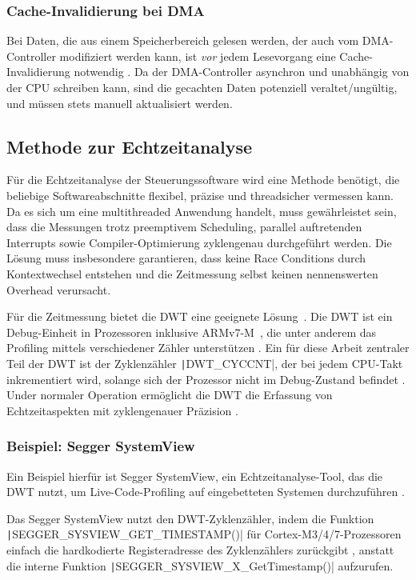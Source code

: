 \subsubsection{Cache-Invalidierung bei DMA}

Bei Daten, die aus einem Speicherbereich gelesen werden, der auch vom
DMA-Controller modifiziert werden kann, ist \textit{vor} jedem Lesevorgang eine
Cache-Invalidierung notwendig \cite{embeddedexpert_cache}. Da der DMA-Controller
asynchron und unabhängig von der CPU schreiben kann, sind die gecachten Daten
potenziell veraltet/ungültig, und müssen stets manuell aktualisiert werden.

\subsection{Methode zur Echtzeitanalyse} \label{sec:dwt}

Für die Echtzeitanalyse der Steuerungssoftware wird eine Methode benötigt, die
beliebige Softwareabschnitte flexibel, präzise und threadsicher vermessen kann.
Da es sich um eine multithreaded Anwendung handelt, muss gewährleistet sein,
dass die Messungen trotz preemptivem Scheduling, parallel auftretenden
Interrupts sowie Compiler-Optimierung zyklengenau durchgeführt werden. Die
Lösung muss insbesondere garantieren, dass keine Race Conditions durch
Kontextwechsel entstehen und die Zeitmessung selbst keinen nennenswerten
Overhead verursacht.

Für die Zeitmessung bietet die \ac{DWT} eine geeignete
Lösung~\cite{ARM_KA001499}. Die DWT ist ein Debug-Einheit in Prozessoren
inklusive ARMv7-M~\cite{ARMv7_ref_man_dwt_about}, die unter anderem das
Profiling mittels verschiedener Zähler unterstützen
\cite{ARMv7_ref_man_dwt_profiling}. Ein für diese Arbeit zentraler Teil der DWT
ist der Zyklenzähler \texttt|DWT_CYCCNT|, der bei jedem CPU-Takt
inkrementiert wird, solange sich der Prozessor nicht im Debug-Zustand befindet
\cite{ARMv7_ref_man_dwt_cycle}. Under normaler Operation ermöglicht die DWT die
Erfassung von Echtzeitaspekten mit zyklengenauer Präzision
\cite{ARMv7_ref_man_dwt}.

\subsubsection{Beispiel: Segger SystemView}

Ein Beispiel hierfür ist Segger SystemView, ein Echtzeitanalyse-Tool, das die
DWT nutzt, um Live-Code-Profiling auf eingebetteten Systemen durchzuführen
\cite{SEGGER_SystemView}.

Das Segger SystemView nutzt den DWT-Zyklenzähler, indem die Funktion \linebreak
\texttt|SEGGER_SYSVIEW_GET_TIMESTAMP()| für Cortex-M3/4/7-Prozessoren
einfach die hardkodierte Registeradresse des Zyklenzählers zurückgibt \cite[S.
65]{Segger_SystemView_manual}\cite{Arm_DWT_Programmers_Model}, anstatt die
interne Funktion \texttt|SEGGER_SYSVIEW_X_GetTimestamp()| aufzurufen.
